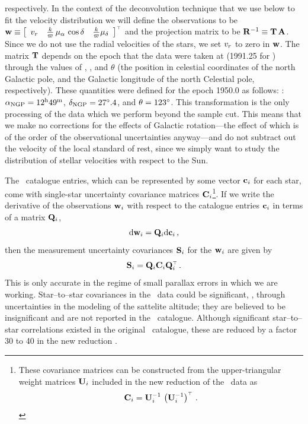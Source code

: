 respectively. In the context of the deconvolution technique that we
use below to fit the velocity distribution we will define the
observations to be $\mathbf{w} \equiv \left[\begin{array}{ccc} v_r &
\frac{k}{\varpi}\,\mu_{\alpha}\,\cos\delta&\frac{k}{\varpi}\mu_{\delta}\end{array}
\right]^{\scriptscriptstyle \top}$ and the projection matrix to be $\mathbf{R}^{-1} \equiv
\mathbf{T}\,\mathbf{A}$. Since we do not use the radial velocities of the stars, we
set $v_r$ to zero in $\mathbf{w}$. The matrix $\mathbf{T}$ depends on the epoch
that the data were taken at (1991.25 for \Hipparcos) through the
values of \rangp, \decngp, and $\theta$ (the position in celestial
coordinates of the north Galactic pole, and the Galactic longitude of
the north Celestial pole, respectively). These quantities were defined
for the epoch 1950.0 as follows: \citep{1960MNRAS.121..123B}: $\alpha_{\textnormal{NGP}}
= 12^{\textnormal{h}}49^{\textnormal{m}}$, $\delta_{\textnormal{NGP}} = 27^{\circ}.4$,
and $\theta = 123^{\circ}$. This transformation is the only processing
of the data which we perform beyond the sample cut. This means that we
make no corrections for the effects of Galactic rotation---the effect
of which is of the order of the observational uncertainties
anyway---and do not subtract out the velocity of the local standard of
rest, since we simply want to study the distribution of stellar
velocities with respect to the Sun.

The \Hipparcos\ catalogue entries, which can be represented by some
vector $\mathbf{c}_i$ for each star, come with single-star uncertainty
covariance matrices $\mathbf{C}_i$\footnote{These covariance matrices can be
constructed from the upper-triangular weight matrices $\mathbf{U}_i$ included
in the new reduction of the \Hipparcos\ data as
\begin{equation}
\mathbf{C}_i= \mathbf{U}_i^{-1}\,\left(\mathbf{U}_i^{-1}\right)^{\scriptscriptstyle \top}\, .
\end{equation}}. If we write
the derivative of the observations $\mathbf{w}_i$ with respect to the
catalogue entries $\mathbf{c}_i$ in terms of a matrix $\mathbf{Q}_i$,
\begin{equation}
\mathrm{d} \mathbf{w}_i = \mathbf{Q}_i \mathrm{d} \mathbf{c}_i\, ,
\end{equation}
then the measurement uncertainty covariances $\mathbf{S}_i$ for the $\mathbf{w}_i$ are
given by
\begin{equation}
\mathbf{S}_i=\mathbf{Q}_i \mathbf{C}_i \mathbf{Q}_i^{\scriptscriptstyle \top}\, .
\end{equation}
This is only accurate in the regime of small parallax errors in which
we are working. Star--to--star covariances in the \Hipparcos\ data
could be significant, \eg, through uncertainties in the modeling of
the sattelite altitude; they are believed to be insignificant and are
not reported in the \Hipparcos\ catalogue. Although significant
star--to--star correlations existed in the original \Hipparcos\
catalogue, these are reduced by a factor 30 to 40 in the new
reduction \citep[see \figurename~2.11 in][]{2007ASSL..250.....V}.



